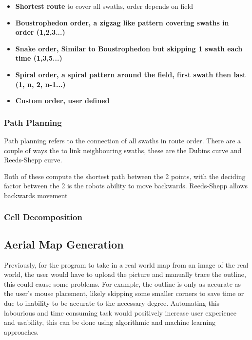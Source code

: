 \documentclass[final]{cmpreport_02}
\begin{document}
\begin{itemize}
	\item{\textbf{Shortest route} to cover all swaths, order depends on field}
	\item\textbf{{Boustrophedon order}, a zigzag like pattern covering swaths in order (1,2,3...)}
	\item\textbf{{Snake order}, Similar to Boustrophedon but skipping 1 swath each time (1,3,5...)}
	\item\textbf{{Spiral order}, a spiral pattern around the field, first swath then last (1, n, 2, n-1...)}
	\item\textbf{{Custom order}, user defined}
\end{itemize}



\subsubsection{Path Planning}
Path planning refers to the connection of all swaths in route order.
There are a couple of ways the to link neighbouring swaths, these are the Dubins curve and Reeds-Shepp curve.


Both of these compute the shortest path between the 2 points, with the deciding factor between the 2 is the robots ability to move backwards.
Reeds-Shepp allows backwards movement


\subsubsection{Cell Decomposition}






\subsection{Aerial Map Generation}
Previously, for the program to take in a real world map from an image of the real world, the user would have to upload the picture and manually trace the outline, this could cause some problems.
For example, the outline is only as accurate as the user's mouse placement, likely skipping some smaller corners to save time or due to inability to be accurate to the necessary degree.
Automating this labourious and time consuming task would positively increase user experience and usability, this can be done using algorithmic and machine learning approaches.
\end{document}
